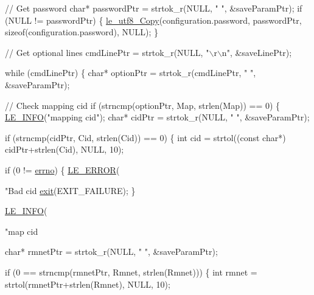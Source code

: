 \begin{DoxyCodeInclude}
{        \textcolor{comment}{// Get password}
        \textcolor{keywordtype}{char}* passwordPtr = strtok\_r(NULL, \textcolor{stringliteral}{" "}, &saveParamPtr);
        \textcolor{keywordflow}{if} (NULL != passwordPtr)
        \{
            \hyperlink{le__utf8_8h_aa5ae72c01396c106fdf3b4741ead7477}{le\_utf8\_Copy}(configuration.password, passwordPtr, \textcolor{keyword}{sizeof}(configuration.password), 
      NULL);
        \}

        \textcolor{comment}{// Get optional lines}
        cmdLinePtr = strtok\_r(NULL, \textcolor{stringliteral}{"\(\backslash\)r\(\backslash\)n"}, &saveLinePtr);

        \textcolor{keywordflow}{while} (cmdLinePtr)
        \{
            \textcolor{keywordtype}{char}* optionPtr = strtok\_r(cmdLinePtr, \textcolor{stringliteral}{" "}, &saveParamPtr);

            \textcolor{comment}{// Check mapping cid}
            \textcolor{keywordflow}{if} (strncmp(optionPtr, Map, strlen(Map)) == 0)
            \{
                \hyperlink{le__log_8h_a23e6d206faa64f612045d688cdde5808}{LE\_INFO}(\textcolor{stringliteral}{"mapping cid"});
                \textcolor{keywordtype}{char}* cidPtr = strtok\_r(NULL, \textcolor{stringliteral}{" "}, &saveParamPtr);

                \textcolor{keywordflow}{if} (strncmp(cidPtr, Cid, strlen(Cid)) == 0)
                \{
                    \textcolor{keywordtype}{int} cid = strtol((\textcolor{keyword}{const} \textcolor{keywordtype}{char}*) cidPtr+strlen(Cid), NULL, 10);

                    \textcolor{keywordflow}{if} (0 != \hyperlink{supervisor_8c_a0a4ccfdbe1cf7b37afc60d34e748b066}{errno})
                    \{
                        \hyperlink{le__log_8h_a353590f91b3143a7ba3a416ae5a50c3d}{LE\_ERROR}(\textcolor{stringliteral}{"Bad cid %
                        \hyperlink{app_stop_client_8c_a310220604a584e112ba8f7aa3dfe23f1}{exit}(EXIT\_FAILURE);
                    \}

                    \hyperlink{le__log_8h_a23e6d206faa64f612045d688cdde5808}{LE\_INFO}(\textcolor{stringliteral}{"map cid %

                    \textcolor{keywordtype}{char}* rmnetPtr = strtok\_r(NULL, \textcolor{stringliteral}{" "}, &saveParamPtr);

                    \textcolor{keywordflow}{if} (0 == strncmp(rmnetPtr, Rmnet, strlen(Rmnet)))
                    \{
                        \textcolor{keywordtype}{int} rmnet = strtol(rmnetPtr+strlen(Rmnet), NULL, 10);

}}}
\end{DoxyCodeInclude}
